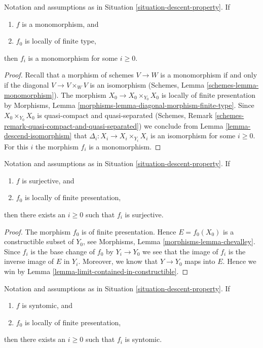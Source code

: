 \begin{lemma}
\label{lemma-descend-monomorphism}
Notation and assumptions as in Situation \ref{situation-descent-property}.
If
\begin{enumerate}
\item $f$ is a monomorphism, and
\item $f_0$ is locally of finite type,
\end{enumerate}
then $f_i$ is a monomorphism for some $i \geq 0$.
\end{lemma}

\begin{proof}
Recall that a morphism of schemes $V \to W$ is a monomorphism if and
only if the diagonal $V \to V \times_W V$ is an isomorphism
(Schemes, Lemma \ref{schemes-lemma-monomorphism}).
The morphism $X_0 \to X_0 \times_{Y_0} X_0$ is locally of finite
presentation by
Morphisms, Lemma \ref{morphisms-lemma-diagonal-morphism-finite-type}.
Since $X_0 \times_{Y_0} X_0$ is quasi-compact and quasi-separated
(Schemes, Remark \ref{schemes-remark-quasi-compact-and-quasi-separated})
we conclude from
Lemma \ref{lemma-descend-isomorphism}
that $\Delta_i : X_i \to X_i \times_{Y_i} X_i$ is an isomorphism for
some $i \geq 0$. For this $i$ the morphism $f_i$ is a monomorphism.
\end{proof}

\begin{lemma}
\label{lemma-descend-surjective}
Notation and assumptions as in Situation \ref{situation-descent-property}.
If
\begin{enumerate}
\item $f$ is surjective, and
\item $f_0$ is locally of finite presentation,
\end{enumerate}
then there exists an $i \geq 0$ such that $f_i$ is surjective.
\end{lemma}

\begin{proof}
The morphism $f_0$ is of finite presentation.
Hence $E = f_0(X_0)$ is a constructible subset of $Y_0$, see
Morphisms, Lemma \ref{morphisms-lemma-chevalley}.
Since $f_i$ is the base change of $f_0$ by
$Y_i \to Y_0$ we see that the image of $f_i$ is the
inverse image of $E$ in $Y_i$. Moreover, we know that
$Y \to Y_0$ maps into $E$. Hence we win by
Lemma \ref{lemma-limit-contained-in-constructible}.
\end{proof}

\begin{lemma}
\label{lemma-descend-syntomic}
Notation and assumptions as in Situation \ref{situation-descent-property}.
If
\begin{enumerate}
\item $f$ is syntomic, and
\item $f_0$ is locally of finite presentation,
\end{enumerate}
then there exists an $i \geq 0$ such that $f_i$ is syntomic.
\end{lemma}


